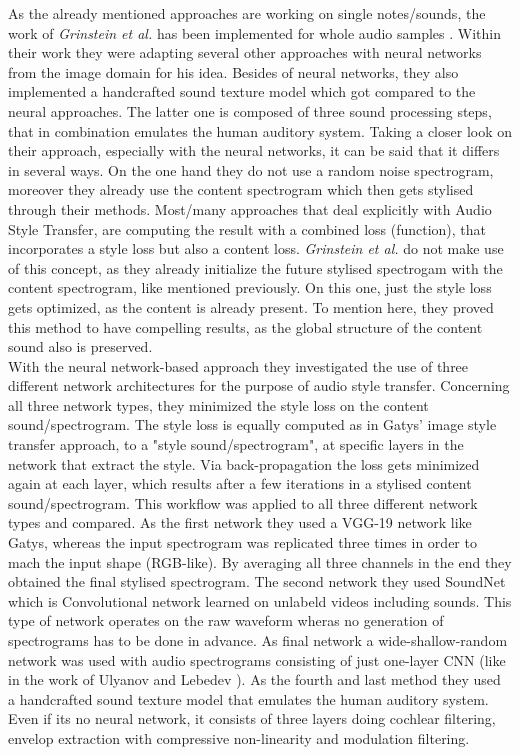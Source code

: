 As the already mentioned approaches are working on single notes/sounds, the work of \textit{Grinstein et al.} has been implemented for whole audio samples \cite{Grinstein2018}. Within their work they were adapting several other approaches with neural networks from the image domain for his idea. Besides of neural networks, they also implemented a handcrafted sound texture model which got compared to the neural approaches. The latter one is composed of three sound processing steps, that in combination emulates the human auditory system. Taking a closer look on their approach, especially with the neural networks, it can be said that it differs in several ways. On the one hand they do not use a random noise spectrogram, moreover they already use the content spectrogram which then gets stylised through their methods. Most/many approaches that deal explicitly with Audio Style Transfer, are computing the result with a combined loss (function), that incorporates a style loss but also a content loss. \textit{Grinstein et al.} do not make use of this concept, as they already initialize the future stylised spectrogam with the content spectrogram, like mentioned previously. On this one, just the style loss gets optimized, as the content is already present. To mention here, they proved this method to have compelling results, as the global structure of the content sound also is preserved.\\
With the neural network-based approach they investigated the use of three different network architectures for the purpose of audio style transfer. Concerning all three network types, they minimized the style loss on the content sound/spectrogram. The style loss is equally computed as in Gatys' image style transfer approach, to a "style sound/spectrogram", at specific layers in the network that extract the style. Via back-propagation the loss gets minimized again at each layer, which results after a few iterations in a stylised content sound/spectrogram. This workflow was applied to all three different network types and compared. As the first network they used a VGG-19 network like Gatys, whereas the input spectrogram was replicated three times in order to mach the input shape (RGB-like). By averaging all three channels in the end they obtained the final stylised spectrogram. The second network they used SoundNet which is Convolutional network learned on unlabeld videos including sounds. This type of network operates on the raw waveform wheras no generation of spectrograms has to be done in advance. As final network a wide-shallow-random network was used with audio spectrograms consisting of just one-layer CNN (like in the work of Ulyanov and Lebedev \cite{ulyanov2016audio}). As the fourth and last method they used a handcrafted sound texture model that emulates the human auditory system. Even if its no neural network, it consists of three layers doing cochlear filtering, envelop extraction with compressive non-linearity and modulation filtering.\\
